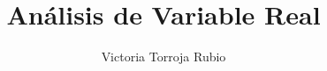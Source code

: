 \documentclass{report}
\begin{document}
\title{Análisis de Variable Real}
\author{Victoria Torroja Rubio}
\date{}

\maketitle

\tableofcontents

\pagebreak

\end{document}
